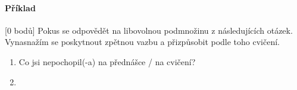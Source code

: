 \documentclass[a4paper,10pt]{article}
\author{Karel Král}
\begin{document}
\newtheorem{theorem}{Věta}
\newtheorem{lemma}[theorem]{Lemma}
\newtheorem{conjecture}[theorem]{Domněnka}
\newtheorem{observation}[theorem]{Pozorování}
\newtheorem{corollary}[theorem]{Důsledek}
\newtheorem*{definition}{Definice}
\pagestyle{fancy}


\paragraph{Příklad}[0 bodů]
Pokus se odpovědět na libovolnou podmnožinu z následujících otázek.
Vynasnažím se poskytnout zpětnou vazbu a přizpůsobit podle toho cvičení.
\begin{enumerate}
	\item  Co jsi nepochopil(-a) na přednášce / na cvičení?
	\item  
\end{enumerate}
\end{document}
